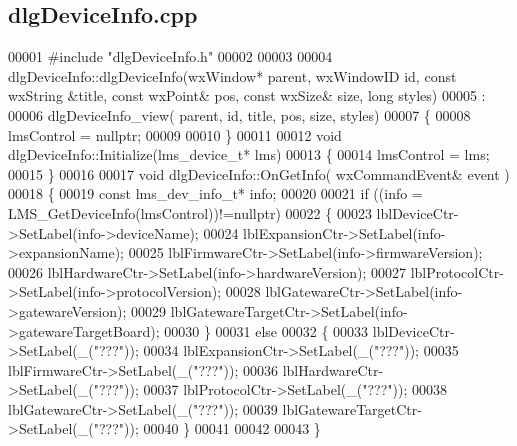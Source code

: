 \subsection{dlg\+Device\+Info.\+cpp}
\label{dlgDeviceInfo_8cpp_source}

\begin{DoxyCode}
00001 \textcolor{preprocessor}{#include "dlgDeviceInfo.h"}
00002 
00003 
00004 dlgDeviceInfo::dlgDeviceInfo(wxWindow* parent, wxWindowID \textcolor{keywordtype}{id}, \textcolor{keyword}{const} wxString &title, \textcolor{keyword}{const} wxPoint& pos, \textcolor{keyword}{
      const} wxSize& size, \textcolor{keywordtype}{long} styles)
00005 :
00006 dlgDeviceInfo_view( parent, id, title, pos, size, styles)
00007 \{
00008     lmsControl = \textcolor{keyword}{nullptr};
00009 
00010 \}
00011 
00012 \textcolor{keywordtype}{void} dlgDeviceInfo::Initialize(lms_device_t* lms)
00013 \{
00014     lmsControl = lms;
00015 \}
00016 
00017 \textcolor{keywordtype}{void} dlgDeviceInfo::OnGetInfo( wxCommandEvent& event )
00018 \{
00019     \textcolor{keyword}{const} lms_dev_info_t* info;
00020 
00021     \textcolor{keywordflow}{if} ((info = LMS_GetDeviceInfo(lmsControl))!=\textcolor{keyword}{nullptr})
00022     \{
00023         lblDeviceCtr->SetLabel(info->deviceName);
00024         lblExpansionCtr->SetLabel(info->expansionName);
00025         lblFirmwareCtr->SetLabel(info->firmwareVersion);
00026         lblHardwareCtr->SetLabel(info->hardwareVersion);
00027         lblProtocolCtr->SetLabel(info->protocolVersion);
00028         lblGatewareCtr->SetLabel(info->gatewareVersion);
00029         lblGatewareTargetCtr->SetLabel(info->gatewareTargetBoard);
00030     \}
00031     \textcolor{keywordflow}{else}
00032     \{
00033         lblDeviceCtr->SetLabel(\_(\textcolor{stringliteral}{"???"}));
00034         lblExpansionCtr->SetLabel(\_(\textcolor{stringliteral}{"???"}));
00035         lblFirmwareCtr->SetLabel(\_(\textcolor{stringliteral}{"???"}));
00036         lblHardwareCtr->SetLabel(\_(\textcolor{stringliteral}{"???"}));
00037         lblProtocolCtr->SetLabel(\_(\textcolor{stringliteral}{"???"}));
00038         lblGatewareCtr->SetLabel(\_(\textcolor{stringliteral}{"???"}));
00039         lblGatewareTargetCtr->SetLabel(\_(\textcolor{stringliteral}{"???"}));
00040     \}
00041 
00042 
00043 \}
\end{DoxyCode}
